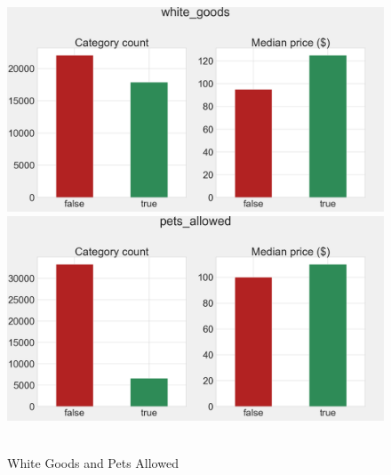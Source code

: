 \begin{figure}[H]
\centering
\caption{White Goods and Pets Allowed}
    \includegraphics[width=\linewidth]{figures/amenities/group1/white_goods.png}
    \vspace{0.5cm}
    \includegraphics[width=\linewidth]{figures/amenities/group1/pets_allowed.png}
    \label{fig:white-goods-and-pets-allowed}
    \
\end{figure}

